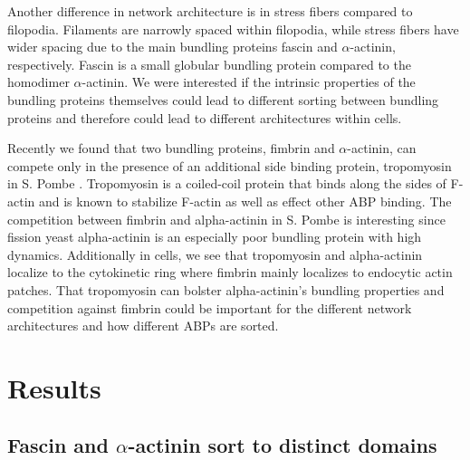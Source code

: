 Another difference in network architecture is in stress fibers compared to filopodia. Filaments are narrowly spaced within filopodia, while stress 
fibers have wider spacing due to the main bundling proteins fascin and 
$\alpha$-actinin, respectively. Fascin is a small globular bundling protein compared to the homodimer $\alpha$-actinin. We were interested if the intrinsic properties of the bundling proteins themselves could lead to different 
sorting between bundling proteins and therefore could lead to different
architectures within cells. 

Recently we found that two bundling proteins, fimbrin and $\alpha$-actinin, can compete only in the presence of an additional side binding protein, tropomyosin in S. Pombe \citep{christensen_competition_2017}. Tropomyosin is a coiled-coil protein that binds along the sides of F-actin and is known to stabilize F-actin as well as effect other ABP binding. The competition between fimbrin and alpha-actinin in S. Pombe is interesting since fission yeast alpha-actinin is an especially poor bundling protein with high dynamics. Additionally in cells, we see that tropomyosin and alpha-actinin localize to the cytokinetic ring where fimbrin mainly localizes to endocytic actin patches. That tropomyosin can bolster alpha-actinin’s bundling properties and competition against fimbrin could be important for the different network architectures and how different ABPs are sorted. 

\section{Results}

\subsection{Fascin and \texorpdfstring{$\alpha$}{a}-actinin sort to distinct domains}

